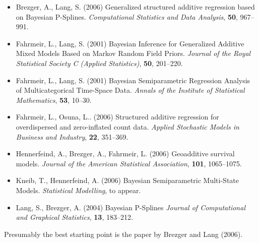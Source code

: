 \documentclass[11pt,a4paper,twoside]{bayesxarticle}
\begin{document}
\begin{itemize}
\item Brezger, A., Lang, S. (2006)
      Generalized structured additive regression based on Bayesian P-Splines.
      {\it Computational Statistics and Data Analysis}, {\bf 50},
      967--991.\vspace{-0.25cm}
\item Fahrmeir, L., Lang, S. (2001)
      Bayesian Inference for Generalized Additive Mixed Models Based on Markov Random Field Priors.
      {\it Journal of the Royal Statistical Society C (Applied Statistics)}, {\bf 50}, 201--220.\vspace{-0.25cm}
\item Fahrmeir, L., Lang, S. (2001)
      Bayesian Semiparametric Regression Analysis of Multicategorical Time-Space Data.
      {\it Annals of the Institute of Statistical Mathematics}, {\bf 53}, 10--30.\vspace{-0.25cm}
\item Fahrmeir, L., Osuna, L.. (2006)
      Structured additive regression for overdispersed and zero-inflated count data.
      {\it Applied Stochastic Models in Business and Industry}, {\bf 22}, 351--369.\vspace{-0.25cm}
\item Hennerfeind, A., Brezger, A., Fahrmeir, L. (2006)
      Geoadditive survival models.
      {\it Journal of the American Statistical Association}, {\bf 101}, 1065--1075.\vspace{-0.25cm}
\item Kneib, T., Hennerfeind, A. (2006)
      Bayesian Semiparametric Multi-State Models.
      {\it Statistical Modelling}, to appear.\vspace{-0.25cm}
\item Lang, S., Brezger, A. (2004)
      Bayesian P-Splines
      {\it Journal of Computational and Graphical Statistics}, {\bf 13}, 183--212.
\end{itemize}

Presumably the best starting point is the paper by Brezger and Lang (2006).
\end{document}
